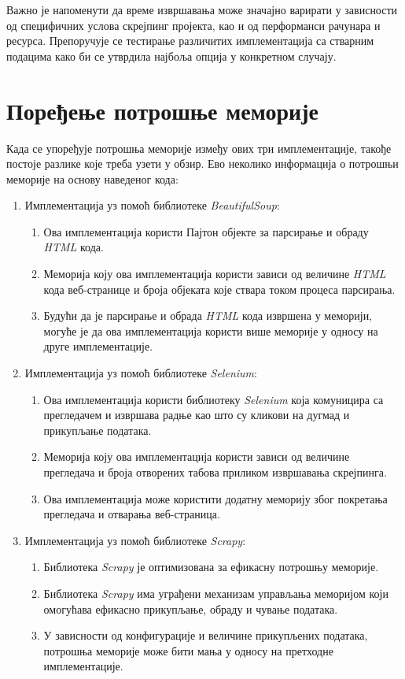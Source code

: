 \documentclass[12pt,oneside]{memoir}
\begin{document}
Важно је напоменути да време извршавања може значајно варирати у зависности од специфичних услова скрејпинг пројекта, као и од перформанси рачунара и ресурса. Препоручује се тестирање различитих имплементација са стварним подацима како би се утврдила најбоља опција у конкретном случају.

\section{Поређење потрошње меморије}
Када се упоређује потрошња меморије између ових три имплементације, такође постоје разлике које треба узети у обзир. Ево неколико информација о потрошњи меморије на основу наведеног кода:

\begin{enumerate}
\item Имплементација уз помоћ библиотеке \textit{BeautifulSoup}:
\begin{enumerate}
\item Ова имплементација користи Пајтон објекте за парсирање и обраду \textit{HTML} кода.
\item Меморија коју ова имплементација користи зависи од величине \textit{HTML} кода веб-странице и броја објеката које ствара током процеса парсирања.
\item Будући да је парсирање и обрада \textit{HTML} кода извршена у меморији, могуће је да ова имплементација користи више меморије у односу на друге имплементације.
\end{enumerate}
\item Имплементација уз помоћ библиотеке \textit{Selenium}:
\begin{enumerate}
\item Ова имплементација користи библиотеку \textit{Selenium} која комуницира са прегледачем и извршава радње као што су кликови на дугмад и прикупљање података.
\item Меморија коју ова имплементација користи зависи од величине прегледача и броја отворених табова приликом извршавања скрејпинга.
\item Ова имплементација може користити додатну меморију због покретања прегледача и отварања веб-страница.
\end{enumerate}
\item Имплементација уз помоћ библиотеке \textit{Scrapy}:
\begin{enumerate}
\item Библиотека \textit{Scrapy} је оптимизована за ефикасну потрошњу меморије.
\item Библиотека \textit{Scrapy} има уграђени механизам управљања меморијом који омогућава ефикасно прикупљање, обраду и чување података.
\item У зависности од конфигурације и величине прикупљених података, потрошња меморије може бити мања у односу на претходне имплементације.
\end{enumerate}
\end{enumerate}
\end{document}
